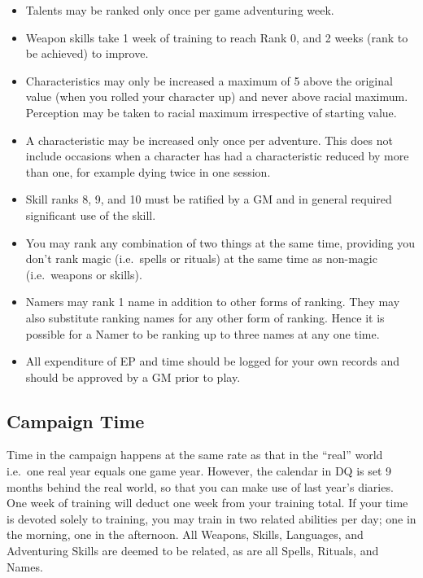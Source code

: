 \documentclass[twoside,a4paper]{article}
\begin{document}
\begin{multicols}{2}
\begin{itemize}
\item
Talents may be ranked only once per game adventuring week.

\item
Weapon skills take 1 week of training to reach Rank 0, and 2 weeks \x
(rank to be achieved) to improve.

\item
Characteristics may only be increased a maximum of 5 above the
original value (when you rolled your character up) and never above
racial maximum.  Perception may be taken to racial maximum
irrespective of starting value.

\item
A characteristic may be increased only once per adventure. This does
not include occasions when a character has had a characteristic
reduced by more than one, for example dying twice in one session.

\item
Skill ranks 8, 9, and 10 must be ratified by a GM and in general
required significant use of the skill.

\item
You may rank any combination of two things at the same time, providing
you don't rank magic (i.e.\  spells or rituals) at the same time as
non-magic (i.e.\ weapons or skills).

\item
Namers may rank 1 name in addition to other forms of ranking.  They
may also substitute ranking names for any other form of ranking.
Hence it is possible for a Namer to be ranking up to three names at
any one time.

\item
All expenditure of EP and time should be logged for your own records
and should be approved by a GM prior to play.
\end{itemize}


\subsection{Campaign Time}

Time in the campaign happens at the same rate as that in the ``real''
world i.e.\ one real year equals one game year. However, the calendar in
DQ is set 9 months behind the real world, so that you can make use of
last year's diaries. One week of training will deduct one week from
your training total. If your time is devoted solely to training, you
may train in two related abilities per day; one in the morning, one in
the afternoon. All Weapons, Skills, Languages, and Adventuring Skills
are deemed to be related, as are all Spells, Rituals, and Names.


\end{multicols}
\end{document}
